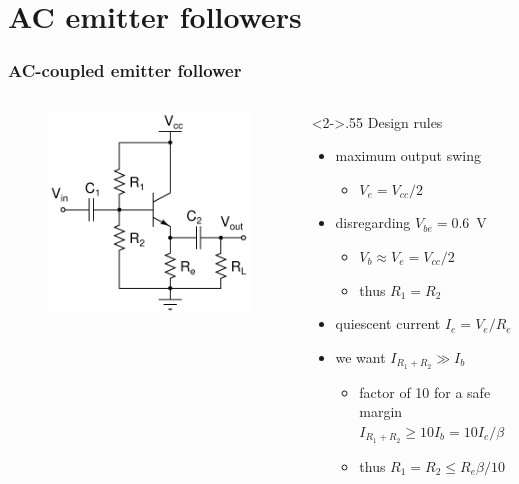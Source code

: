 \documentclass[beamer]{standalone}
\begin{document}
\section{AC emitter followers}
\frame
{ \frametitle{AC-coupled emitter follower}
\begin{columns}[c]
	\begin{column}{.45\textwidth}
		\begin{figure}
			\includegraphics[height=0.50\textheight]{./schematics/npn_ac_emitter_follower}
		\end{figure}
	\end{column}
	\begin{column}<2->{.55\textwidth}
		Design rules
		\begin{itemize}
			\item maximum output swing 
				\begin{itemize}
					\item $V_e=V_{cc} /2 $
				\end{itemize}
			\item disregarding  $V_{be}=0.6$~V
				\begin{itemize}
					\item $V_b \approx V_e=V_{cc}/{2}$
					\item thus $R_1=R_2$
				\end{itemize}
			\item quiescent current
				$I_e=V_e/R_e$
			\item we want $I_{R_1+R_2} \gg I_b$
				\begin{itemize}
					\item factor of 10 for a safe margin
						$I_{R_1+R_2} \ge 10 I_b = 10 I_e / \beta$
					\item thus $R_1=R_2 \le  R_e\beta /10$
				\end{itemize}
		\end{itemize}
	\end{column}
\end{columns}
	
	}
\end{document}
